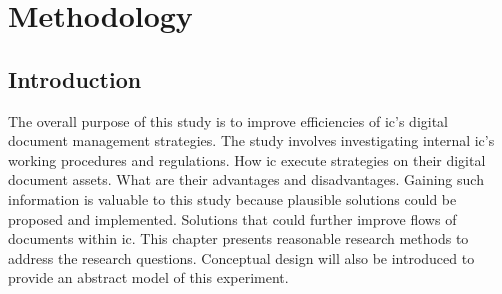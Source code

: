 \chapter{Methodology}
\section{Introduction}
The overall purpose of this study is to improve efficiencies of \gls{ic}'s digital document management strategies. 
The study involves investigating internal \gls{ic}'s working procedures and regulations.
How \gls{ic} execute strategies on their digital document assets.
What are their advantages and disadvantages.
Gaining such information is valuable to this study because plausible solutions could be proposed and implemented. 
Solutions that could further improve flows of documents within \gls{ic}.
This chapter presents reasonable research methods to address the research questions.
Conceptual design will also be introduced to provide an abstract model of this experiment.

